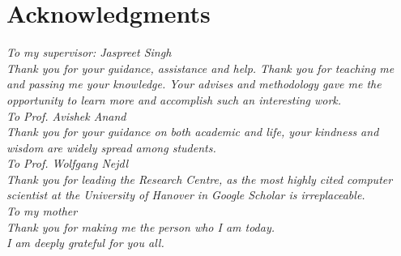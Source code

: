 


\bigskip

\begingroup
\let\clearpage\relax
\let\cleardoublepage\relax
\let\cleardoublepage\relax
\chapter*{Acknowledgments}
\textit{\centering To my supervisor: Jaspreet Singh\\ Thank you for your guidance, assistance and help. Thank you for teaching me and passing me your knowledge. Your advises and methodology gave me the opportunity to learn more and accomplish such an interesting work.\\
\centering To Prof. Avishek Anand \\ Thank you for your guidance on both academic and life, your kindness and wisdom are widely spread among students.\\
\centering To Prof. Wolfgang Nejdl \\ Thank you for leading the Research Centre, as the most highly cited computer scientist at the University of Hanover in Google Scholar is irreplaceable.\\
\centering To my mother\\ Thank you for making me the person who I am today.\\
\centering I am deeply grateful for you all.\\ }

\endgroup



